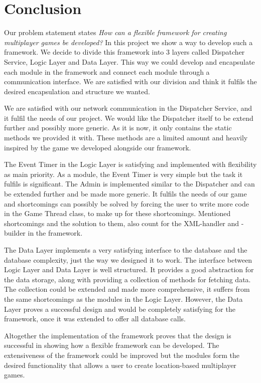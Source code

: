 \section{Conclusion}
Our problem statement states \textit{How can a flexible framework for creating multiplayer games be developed?} In this project we show a way to develop such a framework. We decide to divide this framework into 3 layers called Dispatcher Service, Logic Layer and Data Layer. This way we could develop and encapsulate each module in the framework and connect each module through a communication interface. We are satisfied with our division and think it fulfils the desired encapsulation and structure we wanted. 

We are satisfied with our network communication in the Dispatcher Service, and it fulfil the needs of our project. We would like the Dispatcher itself to be extend further and possibly more generic. As it is now, it only contains the static methods we provided it with. These methods are a limited amount and heavily inspired by the game we developed alongside our framework. 

The Event Timer in the Logic Layer is satisfying and implemented with flexibility as main priority. As a module, the Event Timer is very simple but the task it fulfils is significant. The Admin is implemented similar to the Dispatcher and can be extended further and be made more generic. It fulfils the needs of our game and shortcomings can possibly be solved by forcing the user to write more code in the Game Thread class, to make up for these shortcomings. Mentioned shortcomings and the solution to them, also count for the XML-handler and -builder in the framework.

The Data Layer implements a very satisfying interface to the database and the database complexity, just the way we designed it to work. The interface between Logic Layer and Data Layer is well structured. It provides a good abstraction for the data storage, along with providing a collection of methods for fetching data. The collection could be extended and made more comprehensive, it suffers from the same shortcomings as the modules in the Logic Layer. However, the Data Layer proves a successful design and would be completely satisfying for the framework, once it was extended to offer all database calls. 

Altogether the implementation of the framework proves that the design is successful in showing how a flexible framework can be developed. The extensiveness of the framework could be improved but the modules form the desired functionality that allows a user to create location-based multiplayer games. 